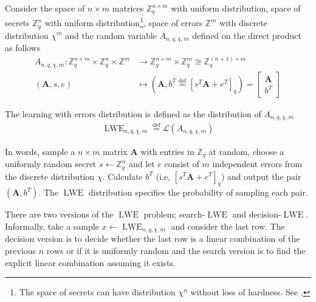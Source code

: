 Consider the space of $n \times m$ matrices $\mathbb{Z}_q^{n \times m}$ with uniform distribution, space of secrets $\mathbb{Z}_q^{n}$ with uniform distribution\footnote{The space of secrets can have distribution $\chi^n$ without loss of hardness. See \cite{Applebaum}.}, space of errors $\mathbb{Z}^{m}$ with discrete distribution $\chi^m$ and the random variable $A_{n, q, \chi, m}$ defined on the direct product as follows
\begin{equation*}
\begin{aligned}
    A_{n, q, \chi, m} \colon \mathbb{Z}_q^{n \times m} \times \mathbb{Z}_q^n \times \mathbb{Z}^m &\to \mathbb{Z}_q^{n \times m} \times \mathbb{Z}_q^m \cong \mathbb{Z}_q^{(n+1) \times m}\\
    (\textbf{A},s,e) &\mapsto (\textbf{A}, b^T \stackrel{\mathrm{def}}{=} [s^T\textbf{A}+e^T]_q) = \left[\begin{array}{c} \textbf{A} \\ b^T \end{array}\right]
\end{aligned}
\end{equation*}
\begin{definition}
    The learning with errors distribution is defined as the distribution of $A_{n, q, \chi, m}$
    \begin{equation*}
    \begin{aligned}
        \operatorname{LWE}_{n, q, \chi, m} \stackrel{\mathrm{def}}{=} \mathcal{L}(A_{n, q, \chi, m})
    \end{aligned}
    \end{equation*}
\end{definition}

In words, sample a $n \times m$ matrix $\textbf{A}$ with entries in $\mathbb{Z}_q$ at random, choose a uniformly random secret $s \leftarrow \mathbb{Z}_q^n$ and let $e$ consist of $m$ independent errors from the discrete distribution $\chi$. Calculate $b^T$ (i.e, $[s^T\textbf{A}+e^T]_q$) and output the pair $(\textbf{A},b^T)$. The $\operatorname{LWE}$ distribution specifies the probability of sampling each pair.

There are two versions of the $\operatorname{LWE}$ problem; search-$\operatorname{LWE}$ and decision-$\operatorname{LWE}$.
Informally, take a sample $x \leftarrow \operatorname{LWE}_{n, q, \chi, m}$ and consider the last row. The decision version is to decide whether the last row is a linear combination of the previous $n$ rows or if it is uniformly random and the search version is to find the explicit linear combination assuming it exists.

